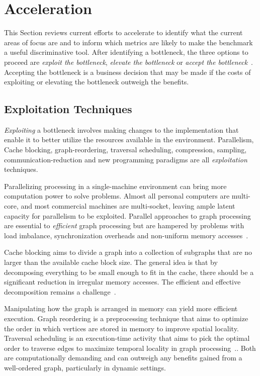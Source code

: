 
\section{\gai Acceleration}
\label{section:34-literature-gai-acceleration}

This Section reviews current efforts to accelerate \gai to identify what the current areas of focus are and to inform which metrics are likely to make the benchmark a useful discriminative tool.
After identifying a bottleneck, the three options to proceed are \textit{exploit the bottleneck}, \textit{elevate the bottleneck} or \textit{accept the bottleneck}~\cite{Goldratt1990,Goldratt2004}.
Accepting the bottleneck is a business decision that may be made if the costs of exploiting or elevating the bottleneck outweigh the benefits. 

\subsection{Exploitation Techniques}
\textit{Exploiting} a bottleneck involves making changes to the implementation that enable it to better utilize the resources available in the environment. 
Parallelism, Cache blocking, graph-reordering, traversal scheduling, compression, sampling, communication-reduction and new programming paradigms are all \textit{exploitation} techniques.

Parallelizing processing in a single-machine environment can bring more computation power to solve problems. 
Almost all personal computers are multi-core, and most commercial machines are multi-socket, leaving ample latent capacity for parallelism to be exploited. 
Parallel approaches to graph processing are essential to \textit{efficient} graph processing but are hampered by problems with load imbalance, synchronization overheads and non-uniform memory accesses~\cite{Beamer2015}.

Cache blocking aims to divide a graph into a collection of subgraphs that are no larger than the available cache block size. 
The general idea is that by decomposing everything to be small enough to fit in the cache, there should be a significant reduction in irregular memory accesses. 
The efficient and effective decomposition remains a challenge~\cite{Balaji2018, Beamer2017, Ham2016, Zhang2020, Sundaram2015}.

Manipulating how the graph is arranged in memory can yield more efficient execution. 
Graph reordering is a preprocessing technique that aims to optimize the order in which vertices are stored in memory to improve spatial locality\cite{Balaji2018}.
Traversal scheduling is an execution-time activity that aims to pick the optimal order to traverse edges to maximize temporal locality in graph processing~\cite{Mukkara2018}.. 
Both are computationally demanding and can outweigh any benefits gained from a well-ordered graph, particularly in dynamic settings. 

